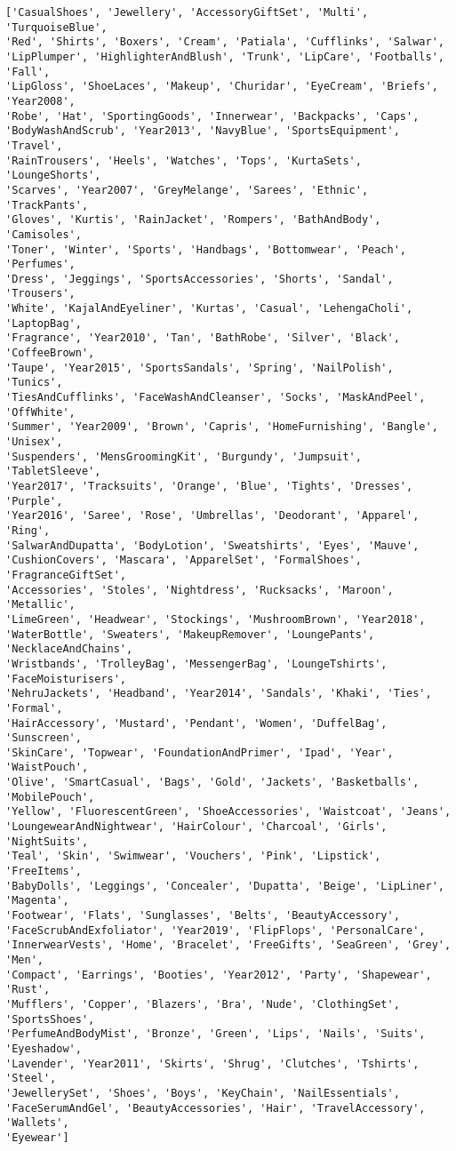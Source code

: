 \documentclass[11pt]{article}
\begin{document}
    \begin{Verbatim}[commandchars=\\\{\}]
['CasualShoes', 'Jewellery', 'AccessoryGiftSet', 'Multi', 'TurquoiseBlue',
'Red', 'Shirts', 'Boxers', 'Cream', 'Patiala', 'Cufflinks', 'Salwar',
'LipPlumper', 'HighlighterAndBlush', 'Trunk', 'LipCare', 'Footballs', 'Fall',
'LipGloss', 'ShoeLaces', 'Makeup', 'Churidar', 'EyeCream', 'Briefs', 'Year2008',
'Robe', 'Hat', 'SportingGoods', 'Innerwear', 'Backpacks', 'Caps',
'BodyWashAndScrub', 'Year2013', 'NavyBlue', 'SportsEquipment', 'Travel',
'RainTrousers', 'Heels', 'Watches', 'Tops', 'KurtaSets', 'LoungeShorts',
'Scarves', 'Year2007', 'GreyMelange', 'Sarees', 'Ethnic', 'TrackPants',
'Gloves', 'Kurtis', 'RainJacket', 'Rompers', 'BathAndBody', 'Camisoles',
'Toner', 'Winter', 'Sports', 'Handbags', 'Bottomwear', 'Peach', 'Perfumes',
'Dress', 'Jeggings', 'SportsAccessories', 'Shorts', 'Sandal', 'Trousers',
'White', 'KajalAndEyeliner', 'Kurtas', 'Casual', 'LehengaCholi', 'LaptopBag',
'Fragrance', 'Year2010', 'Tan', 'BathRobe', 'Silver', 'Black', 'CoffeeBrown',
'Taupe', 'Year2015', 'SportsSandals', 'Spring', 'NailPolish', 'Tunics',
'TiesAndCufflinks', 'FaceWashAndCleanser', 'Socks', 'MaskAndPeel', 'OffWhite',
'Summer', 'Year2009', 'Brown', 'Capris', 'HomeFurnishing', 'Bangle', 'Unisex',
'Suspenders', 'MensGroomingKit', 'Burgundy', 'Jumpsuit', 'TabletSleeve',
'Year2017', 'Tracksuits', 'Orange', 'Blue', 'Tights', 'Dresses', 'Purple',
'Year2016', 'Saree', 'Rose', 'Umbrellas', 'Deodorant', 'Apparel', 'Ring',
'SalwarAndDupatta', 'BodyLotion', 'Sweatshirts', 'Eyes', 'Mauve',
'CushionCovers', 'Mascara', 'ApparelSet', 'FormalShoes', 'FragranceGiftSet',
'Accessories', 'Stoles', 'Nightdress', 'Rucksacks', 'Maroon', 'Metallic',
'LimeGreen', 'Headwear', 'Stockings', 'MushroomBrown', 'Year2018',
'WaterBottle', 'Sweaters', 'MakeupRemover', 'LoungePants', 'NecklaceAndChains',
'Wristbands', 'TrolleyBag', 'MessengerBag', 'LoungeTshirts', 'FaceMoisturisers',
'NehruJackets', 'Headband', 'Year2014', 'Sandals', 'Khaki', 'Ties', 'Formal',
'HairAccessory', 'Mustard', 'Pendant', 'Women', 'DuffelBag', 'Sunscreen',
'SkinCare', 'Topwear', 'FoundationAndPrimer', 'Ipad', 'Year', 'WaistPouch',
'Olive', 'SmartCasual', 'Bags', 'Gold', 'Jackets', 'Basketballs', 'MobilePouch',
'Yellow', 'FluorescentGreen', 'ShoeAccessories', 'Waistcoat', 'Jeans',
'LoungewearAndNightwear', 'HairColour', 'Charcoal', 'Girls', 'NightSuits',
'Teal', 'Skin', 'Swimwear', 'Vouchers', 'Pink', 'Lipstick', 'FreeItems',
'BabyDolls', 'Leggings', 'Concealer', 'Dupatta', 'Beige', 'LipLiner', 'Magenta',
'Footwear', 'Flats', 'Sunglasses', 'Belts', 'BeautyAccessory',
'FaceScrubAndExfoliator', 'Year2019', 'FlipFlops', 'PersonalCare',
'InnerwearVests', 'Home', 'Bracelet', 'FreeGifts', 'SeaGreen', 'Grey', 'Men',
'Compact', 'Earrings', 'Booties', 'Year2012', 'Party', 'Shapewear', 'Rust',
'Mufflers', 'Copper', 'Blazers', 'Bra', 'Nude', 'ClothingSet', 'SportsShoes',
'PerfumeAndBodyMist', 'Bronze', 'Green', 'Lips', 'Nails', 'Suits', 'Eyeshadow',
'Lavender', 'Year2011', 'Skirts', 'Shrug', 'Clutches', 'Tshirts', 'Steel',
'JewellerySet', 'Shoes', 'Boys', 'KeyChain', 'NailEssentials',
'FaceSerumAndGel', 'BeautyAccessories', 'Hair', 'TravelAccessory', 'Wallets',
'Eyewear']
    \end{Verbatim}
\end{document}
